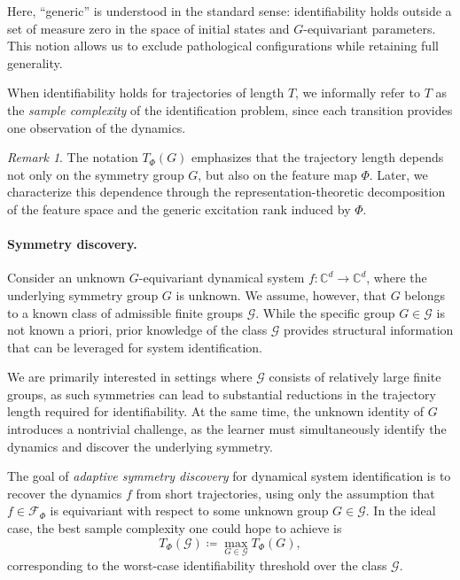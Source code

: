 \documentclass[11pt]{article}
\theoremstyle{plain}
\theoremstyle{definition}
\theoremstyle{remark}
\newtheorem{remark}[theorem]{Remark}
\begin{document}
Here, ``generic'' is understood in the standard sense: identifiability holds outside a set of measure zero in the space of initial states and \(G\)-equivariant parameters. This notion allows us to exclude pathological configurations while retaining full generality.

When identifiability holds for trajectories of length \(T\), we informally refer to \(T\) as the \emph{sample complexity} of the identification problem, since each transition provides one observation of the dynamics.


\begin{remark}
The notation \(T_\Phi(G)\) emphasizes that the trajectory length depends not only on the symmetry group \(G\), but also on the feature map \(\Phi\). Later, we characterize this dependence through the representation-theoretic decomposition of the feature space and the generic excitation rank induced by \(\Phi\).
\end{remark}
 


 
\paragraph{Symmetry discovery.}
Consider an unknown \(G\)-equivariant dynamical system
\(f:\mathbb C^d\to\mathbb C^d\), where the underlying symmetry group
\(G\) is unknown. We assume, however, that \(G\) belongs to a known class of
admissible finite groups \(\mathcal{G}\). While the specific group
\(G \in \mathcal{G}\) is not known a priori, prior knowledge of the class
\(\mathcal{G}\) provides structural information that can be leveraged for
system identification.

We are primarily interested in settings where \(\mathcal{G}\) consists of
relatively large finite groups, as such symmetries can lead to substantial
reductions in the trajectory length required for identifiability. At the
same time, the unknown identity of \(G\) introduces a nontrivial challenge,
as the learner must simultaneously identify the dynamics and discover the
underlying symmetry.

The goal of \emph{adaptive symmetry discovery} for dynamical system
identification is to recover the dynamics \(f\) from short trajectories,
using only the assumption that \(f\in\mathcal F_\Phi\) is equivariant with respect to some
unknown group \(G \in \mathcal{G}\). In the ideal case, the best sample
complexity one could hope to achieve is
\[
    T_\Phi(\mathcal{G}) \coloneqq \max_{G \in \mathcal{G}} T_\Phi(G),
\]
corresponding to the worst-case identifiability threshold over the class
\(\mathcal{G}\).
\end{document}
